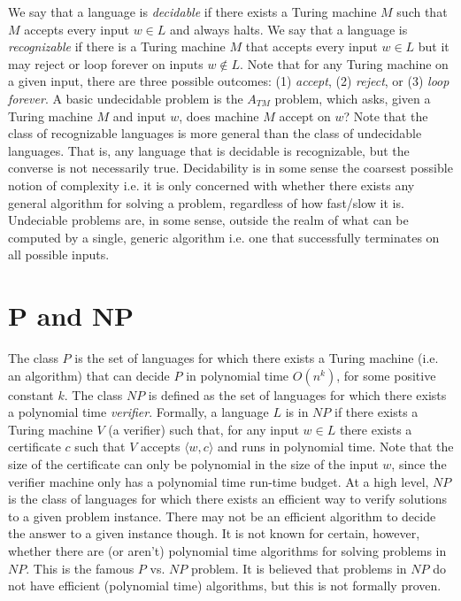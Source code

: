 \documentclass[10pt,a4paper]{article}
\begin{document}
We say that a language is \textit{decidable} if there exists a Turing machine $M$ such that $M$ accepts every input $w \in L$ and always halts. We say that a language is \textit{recognizable} if there is a Turing machine $M$ that accepts every input $w \in L$ but it may reject or loop forever on inputs $w \notin L$. Note that for any Turing machine on a given input, there are three possible outcomes: (1) \textit{accept}, (2)  \textit{reject}, or (3) \textit{loop forever}. A basic undecidable problem is the $A_{TM}$ problem, which asks, given a Turing machine $M$ and input $w$, does machine $M$ accept on $w$? Note that the class of recognizable languages is more general than the class of undecidable languages. That is, any language that is decidable is recognizable, but the converse is not necessarily true. Decidability is in some sense the coarsest possible notion of complexity i.e. it is only concerned with whether there exists any general algorithm for solving a problem, regardless of how fast/slow it is. Undeciable problems are, in some sense, outside the realm of what can be computed by a single, generic algorithm i.e. one that successfully terminates on all possible inputs.


\section{P and NP}

The class $P$ is the set of languages for which there exists a Turing machine (i.e. an algorithm) that can decide $P$ in polynomial time $O(n^k)$, for some positive constant $k$. The class $NP$ is defined as the set of languages for which there exists a polynomial time \textit{verifier}. Formally, a language $L$ is in $NP$ if there exists a Turing machine $V$ (a verifier) such that, for any input $w \in L$ 
there exists a certificate $c$ such that $V$ accepts $\langle w,c \rangle$ and runs in polynomial time. Note that the size of the certificate can only be polynomial in the size of the input $w$, since the verifier machine only has a polynomial time run-time budget. At a high level, $NP$ is the class of languages for which there exists an efficient way to verify solutions to a given problem instance. There may not be an efficient algorithm to decide the answer to a given instance though. It is not known for certain, however, whether there are (or aren't) polynomial time algorithms for solving problems in $NP$. This is the famous $P$ vs. $NP$ problem. It is believed that problems in $NP$ do not have efficient (polynomial time) algorithms, but this is not formally proven. 
\end{document}

